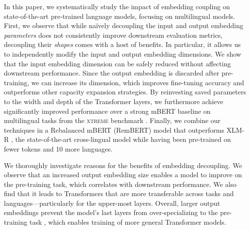 \documentclass{article} \usepackage{iclr2021_conference,times}
\newcommand{\xtreme}{\textsc{xtreme}\xspace}
\begin{document}
In this paper, we systematically study the impact of embedding coupling on state-of-the-art pre-trained language models, focusing on multilingual models.
First, we observe that while na\"ively decoupling the input and output embedding \emph{parameters} does not consistently improve downstream evaluation metrics, decoupling their \emph{shapes} comes with a host of benefits. In particular, it allows us to independently modify the input and output embedding dimensions. We show that the input embedding dimension can be safely reduced without affecting downstream performance. Since the output embedding is discarded after pre-training, we can increase its dimension, which improves fine-tuning accuracy and outperforms other capacity expansion strategies. By reinvesting saved parameters to the width and depth of the Transformer layers, we furthermore achieve significantly improved performance over a strong mBERT \citep{Devlin2019} baseline on multilingual tasks from the \xtreme benchmark \citep{Hu2020}. Finally, we combine our techniques in a Rebalanced mBERT (RemBERT) model that outperforms XLM-R \citep{Conneau2020}, the state-of-the-art cross-lingual model while having been pre-trained on  fewer tokens and 10 more languages.






We thoroughly investigate reasons for the benefits of embedding decoupling. We observe that an increased output embedding size enables a model to improve on the pre-training task, which correlates with downstream performance. We also find that it leads to Transformers that are more transferable across tasks and languages---particularly for the upper-most layers. Overall, larger output embeddings prevent the model's last layers from over-specializing to the pre-training task \citep{Zhang2020,Tamkin2020}, which enables training of more general Transformer models.
\end{document}
